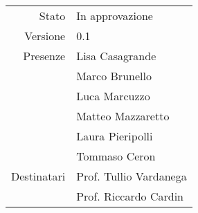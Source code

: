 \begin{center}
\begin{tabular}{r|l}
	Stato & In approvazione \\
	Versione & 0.1 \\
	Presenze & Lisa Casagrande \\
	         & Marco Brunello \\
                   & Luca Marcuzzo \\
	         & Matteo Mazzaretto \\
	         & Laura Pieripolli \\
	         & Tommaso Ceron \\
	Destinatari & Prof. Tullio Vardanega \\
	            & Prof. Riccardo Cardin
\end{tabular}
\end{center}